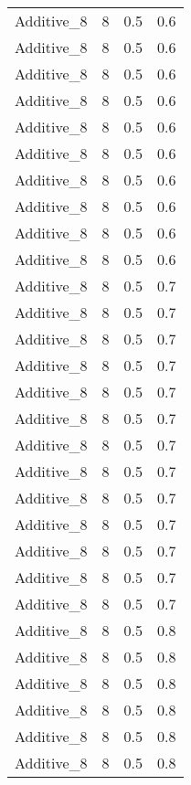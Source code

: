 \documentclass{article}
\begin{document}
\begin{longtable}[H]{lrrr}
 Additive\_8 &       8 &   0.5 &            0.6 \\
 Additive\_8 &       8 &   0.5 &            0.6 \\
 Additive\_8 &       8 &   0.5 &            0.6 \\
 Additive\_8 &       8 &   0.5 &            0.6 \\
 Additive\_8 &       8 &   0.5 &            0.6 \\
 Additive\_8 &       8 &   0.5 &            0.6 \\
 Additive\_8 &       8 &   0.5 &            0.6 \\
 Additive\_8 &       8 &   0.5 &            0.6 \\
 Additive\_8 &       8 &   0.5 &            0.6 \\
 Additive\_8 &       8 &   0.5 &            0.6 \\
 Additive\_8 &       8 &   0.5 &            0.7 \\
 Additive\_8 &       8 &   0.5 &            0.7 \\
 Additive\_8 &       8 &   0.5 &            0.7 \\
 Additive\_8 &       8 &   0.5 &            0.7 \\
 Additive\_8 &       8 &   0.5 &            0.7 \\
 Additive\_8 &       8 &   0.5 &            0.7 \\
 Additive\_8 &       8 &   0.5 &            0.7 \\
 Additive\_8 &       8 &   0.5 &            0.7 \\
 Additive\_8 &       8 &   0.5 &            0.7 \\
 Additive\_8 &       8 &   0.5 &            0.7 \\
 Additive\_8 &       8 &   0.5 &            0.7 \\
 Additive\_8 &       8 &   0.5 &            0.7 \\
 Additive\_8 &       8 &   0.5 &            0.7 \\
 Additive\_8 &       8 &   0.5 &            0.8 \\
 Additive\_8 &       8 &   0.5 &            0.8 \\
 Additive\_8 &       8 &   0.5 &            0.8 \\
 Additive\_8 &       8 &   0.5 &            0.8 \\
 Additive\_8 &       8 &   0.5 &            0.8 \\
 Additive\_8 &       8 &   0.5 &            0.8 \\

\end{longtable}
\end{document}
